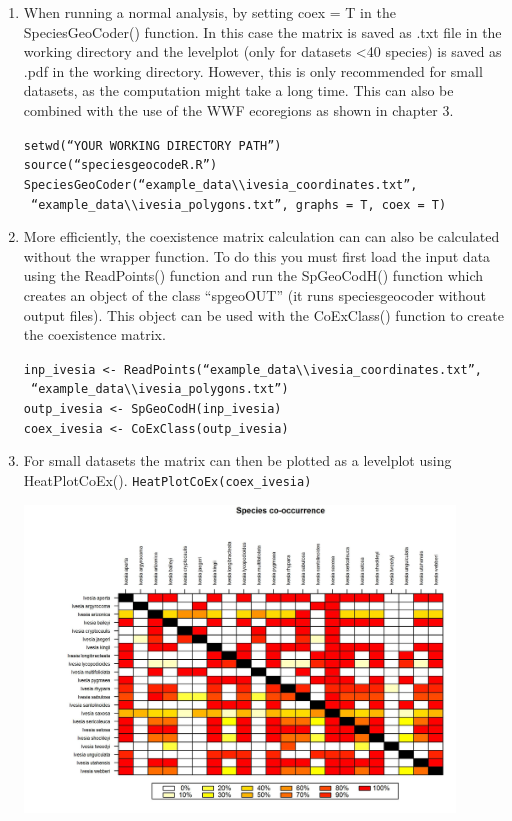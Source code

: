 \documentclass[a4paper,titlepage,11pt]{scrreprt}
\begin{document}
\begin{enumerate}
\item{When running a normal analysis, by setting coex = T in the SpeciesGeoCoder() function. In this case the matrix is saved as .txt file in the working directory and the levelplot (only for datasets \textless 40 species) is saved as .pdf in the working directory.  However, this is only recommended for small datasets, as the computation might take a long time. This can also be combined with the use of the WWF ecoregions as shown in chapter 3.}

\texttt{setwd(``YOUR WORKING DIRECTORY PATH'')}\\
\texttt{source(``speciesgeocodeR.R'')}\\
\texttt{SpeciesGeoCoder(``example\_data\textbackslash \textbackslash ivesia\_coordinates.txt'',}\\
\texttt{ ``example\_data\textbackslash \textbackslash ivesia\_polygons.txt'',  graphs = T, coex = T)}

\item{More efficiently, the coexistence matrix calculation can can also be calculated without the wrapper function. To do this you must first load the input data using the ReadPoints() function and run the SpGeoCodH() function which creates an object of the class ``spgeoOUT'' (it runs speciesgeocoder without output files). This object can be used with the CoExClass() function to create the coexistence matrix.}

\texttt{inp\_ivesia  \textless- ReadPoints(``example\_data\textbackslash \textbackslash ivesia\_coordinates.txt'',}\\
\texttt{ ``example\_data\textbackslash \textbackslash ivesia\_polygons.txt'')}\\
\texttt{outp\_ivesia \textless- SpGeoCodH(inp\_ivesia)}\\
\texttt{coex\_ivesia \textless- CoExClass(outp\_ivesia)}

\item{For small datasets the matrix can then be plotted as a levelplot using HeatPlotCoEx().}
\texttt{HeatPlotCoEx(coex\_ivesia)}

\begin{center}
\includegraphics[width=0.9\textwidth]{figures/levelplot_ivesia.jpeg}
\end{center}


\end{enumerate}
\end{document}
